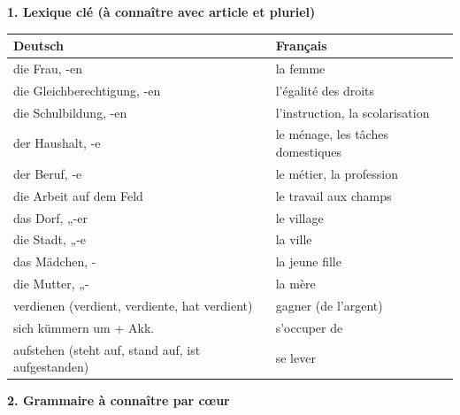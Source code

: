 \documentclass[11pt]{article}
\begin{document}
\begin{aretenir}
\textbf{1. Lexique clé (à connaître avec article et pluriel)}

\begin{center}
\begin{tabularx}{\linewidth}{|X|X|}\hline
\rowcolor{popblueL} \textbf{Deutsch} & \textbf{Français} \\ \hline
die Frau, -en & la femme \\ \hline
die Gleichberechtigung, -en & l'égalité des droits \\ \hline
die Schulbildung, -en & l'instruction, la scolarisation \\ \hline
der Haushalt, -e & le ménage, les tâches domestiques \\ \hline
der Beruf, -e & le métier, la profession \\ \hline
die Arbeit auf dem Feld & le travail aux champs \\ \hline
das Dorf, „-er & le village \\ \hline
die Stadt, „-e & la ville \\ \hline
das Mädchen, - & la jeune fille \\ \hline
die Mutter, „- & la mère \\ \hline
verdienen (verdient, verdiente, hat verdient) & gagner (de l'argent) \\ \hline
sich kümmern um + Akk. & s'occuper de \\ \hline
aufstehen (steht auf, stand auf, ist aufgestanden) & se lever \\ \hline
\end{tabularx}
\end{center}

\textbf{2. Grammaire à connaître par cœur}


\end{aretenir}
\end{document}

